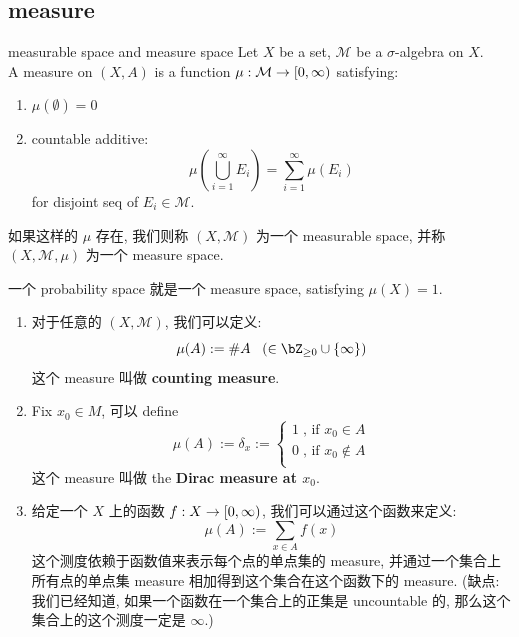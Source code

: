 \subsection{measure}
\begin{definition}{measurable space and measure space}
    Let $X$ be a set, $\mathcal{M}$ be a $\sigma$-algebra on $X$.\\
    A measure on $(X,A)$ is a function $\mu: \mathcal{M} \rightarrow [0, \infty)$ satisfying:
    \begin{enumerate}
        \item $\mu(\emptyset) = 0$
        \item countable additive: 
        $$
        \mu(\bigcup_{i=1}^\infty E_i) = \sum_{i=1}^{\infty} \mu(E_i)  
        $$ for disjoint seq of $E_i \in \mathcal{M}$.
    \end{enumerate}

    如果这样的 $\mu$ 存在, 我们则称 $(X,\mathcal{M})$ 为一个 measurable space, 并称 $(X,\mathcal{M}, \mu)$ 为一个 measure space.
\end{definition}
\begin{remark}
    一个 probability space 就是一个 measure space, satisfying $\mu(X) = 1$.
\end{remark}

\begin{example}
\begin{enumerate}
    \item 对于任意的 $(X, \mathcal{M})$, 我们可以定义:
    $$
    \mu(A) := \#A \;\;\;(\in \bZ_{\geq 0} \cup \{\infty \})
    $$
    这个 measure 叫做 \textbf{counting measure}.
    \item 
    Fix $x_0 \in M$, 可以 define
    $$
    \mu(A) := \delta_x := \begin{cases}
        1 \; \text{, if } x_0 \in A \\
        0 \; \text{, if } x_0 \not\in A \\
    \end{cases}
    $$
    这个 measure 叫做 the \textbf{Dirac measure at $x_0$}.
    \item 
    给定一个 $X$ 上的函数 $f: X \rightarrow [0, \infty)$, 我们可以通过这个函数来定义:
    $$
    \mu(A) := \sum_{x \in A} f(x)
    $$
    这个测度依赖于函数值来表示每个点的单点集的 measure, 并通过一个集合上所有点的单点集 measure 相加得到这个集合在这个函数下的 measure. (缺点: 我们已经知道, 如果一个函数在一个集合上的正集是 uncountable 的, 那么这个集合上的这个测度一定是 $\infty$.)
    \end{enumerate}
\end{example}



